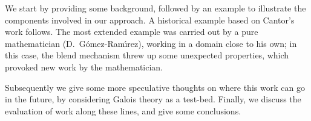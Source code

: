 We start by providing some background, followed by an example to
illustrate the components involved in our approach. A historical
example based on Cantor's work follows.  The most extended example was
carried out by a pure mathematician (D.\ G{\'o}mez-Ram{\'{\i}}rez), working in a
domain close to his own; in this case, the blend mechanism threw up
some unexpected properties, which provoked new work by the
mathematician.

Subsequently we give some more speculative thoughts on where this work
can go in the future, by considering Galois theory as a test-bed.
Finally, we discuss the evaluation of work along these lines, and
give some conclusions.

